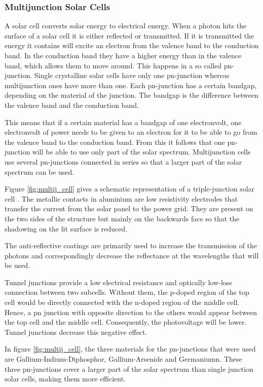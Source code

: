 \clearpage
\subsubsection{Multijunction Solar Cells}
A solar cell converts solar energy to electrical energy. When a photon hits the surface of a solar cell it is either reflected or transmitted.
If it is transmitted the energy it contains will excite an electron from the valence band to the conduction band. In the conduction band they have a higher energy than in the valence band, which allows them to move around. This happens in a so called pn-junction. Single crystalline solar cells have only one pn-junction whereas multijunction ones have more than one. Each pn-junction has a certain bandgap, depending on the material of the junction. The bandgap is the difference between the valence band and the conduction band.

This means that if a certain material has a bandgap of one electronvolt, one electronvolt of power needs to be given to an electron for it to be able to go from the valence band to the conduction band. From this it follows that one pn-junction will be able to use only part of the solar spectrum. Multijunction cells use several pn-junctions connected in series so that a larger part of the solar spectrum can be used.

Figure \ref{fig:multij_cell} gives a schematic representation of a triple-junction solar cell \cite{spectrolab}. The metallic contacts in aluminium are low resistivity electrodes that transfer the current from the solar panel to the power grid. They are present on the two sides of the structure but mainly on the backwards face so that the shadowing on the lit surface is reduced.

The anti-reflective coatings are primarily used to increase the transmission of the photons and correspondingly decrease the reflectance at the wavelengths that will be used.

Tunnel junctions provide a low electrical resistance and optically low-loss connection between two subcells. Without them, the p-doped region of the top cell would be directly connected with the n-doped region of the middle cell. Hence, a pn junction with opposite direction to the others would appear between the top cell and the middle cell. Consequently, the photovoltage will be lower. Tunnel junctions decrease this negative effect.

In figure \ref{fig:multij_cell}, the three materials for the pn-junctions that were used are Gallium-Indium-Diphosphor, Gallium-Arsenide and Germaniumn. These three pn-junctions cover a larger part of the solar spectrum than single junction solar cells, making them more efficient.

